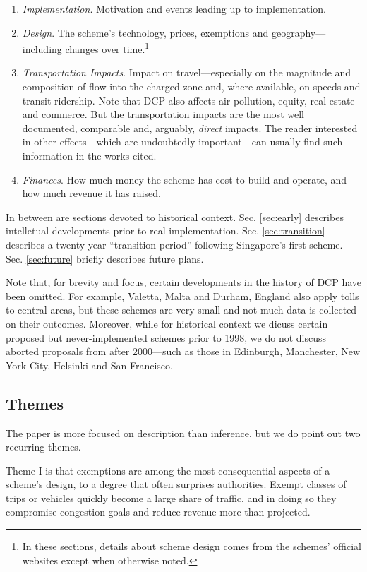 \begin{enumerate}
    \item \emph{Implementation}. Motivation and events leading up to implementation.
    \item \emph{Design}. The scheme's technology, prices, exemptions and geography---including changes over time.\footnote{In these sections, details about scheme design comes from the schemes' official websites except when otherwise noted.}
    \item \emph{Transportation Impacts}. Impact on travel---especially on the magnitude and composition of flow into the charged zone and, where available, on speeds and transit ridership. Note that DCP also affects air pollution, equity, real estate and commerce. But the transportation impacts are the most well documented, comparable and, arguably, \emph{direct} impacts. The reader interested in other effects---which are undoubtedly important---can usually find such information in the works cited.
    \item \emph{Finances}. How much money the scheme has cost to build and operate, and how much revenue it has raised.
\end{enumerate}

In between are sections devoted to historical context. Sec. \ref{sec:early} describes intelletual developments prior to real implementation. Sec. \ref{sec:transition} describes a twenty-year ``transition period'' following Singapore's first scheme. Sec. \ref{sec:future} briefly describes future plans. 

Note that, for brevity and focus, certain developments in the history of DCP have been omitted. For example, Valetta, Malta \citep{Attard2010} and Durham, England \citep[p.269]{Santos2006a} also apply tolls to central areas, but these schemes are very small and not much data is collected on their outcomes. Moreover, while for historical context we dicuss certain proposed but never-implemented schemes prior to 1998, we do not discuss aborted proposals from after 2000---such as those in Edinburgh, Manchester, New York City, Helsinki and San Francisco.

\subsection{Themes}\label{ssec:themes}

The paper is more focused on description than inference, but we do point out two recurring themes.

Theme I is that exemptions are among the most consequential aspects of a scheme's design, to a degree that often surprises authorities. Exempt classes of trips or vehicles quickly become a large share of traffic, and in doing so they compromise congestion goals and reduce revenue more than projected.

